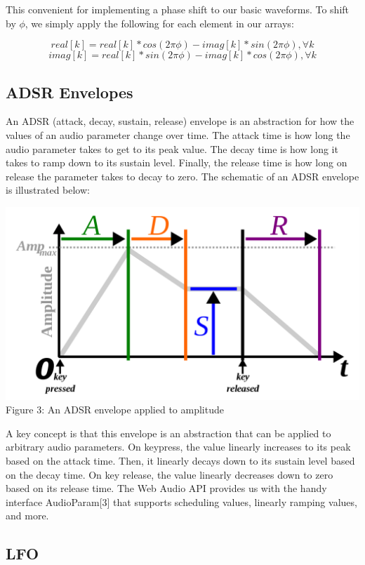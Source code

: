 \documentclass[a4paper, 12pt]{article}
\begin{document}
This convenient for implementing a phase shift to our basic waveforms. To shift by $\phi$, we simply apply the following for each element in our arrays:

$$real[k] = real[k] * cos(2 \pi \phi) - imag[k] * sin(2 \pi \phi), \forall k$$
$$imag[k] = real[k] * sin(2 \pi \phi) - imag[k] * cos(2 \pi \phi), \forall k$$

\subsection*{ADSR Envelopes}

An ADSR (attack, decay, sustain, release) envelope is an abstraction for how the values of an audio parameter change over time. The attack time is how long the audio parameter takes to get to its peak value. The decay time is how long it takes to ramp down to its sustain level. Finally, the release time is how long on release the parameter takes to decay to zero. The schematic of an ADSR envelope is illustrated below:

\begin{center}
\includegraphics[scale=0.4]{adsr.png}
Figure 3: An ADSR envelope applied to amplitude
\end{center}

A key concept is that this envelope is an abstraction that can be applied to arbitrary audio parameters. On keypress, the value linearly increases to its peak based on the attack time. Then, it linearly decays down to its sustain level based on the decay time. On key release, the value linearly decreases down to zero based on its release time. The Web Audio API provides us with the handy interface AudioParam[3] that supports scheduling values, linearly ramping values, and more.

\subsection*{LFO}
\end{document}

